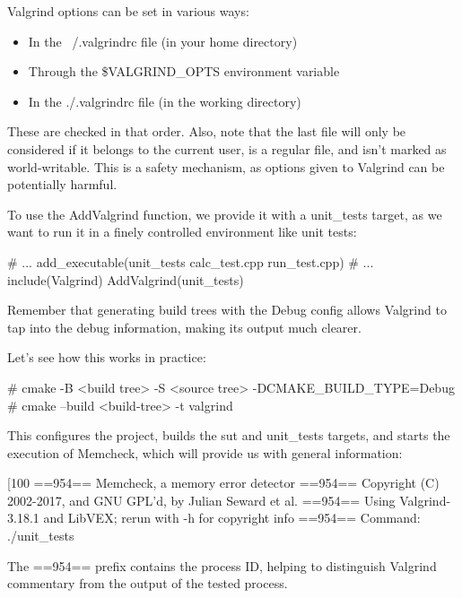 Valgrind options can be set in various ways:

\begin{itemize}
\item
In the ~/.valgrindrc file (in your home directory)

\item
Through the \$VALGRIND\_OPTS environment variable

\item
In the ./.valgrindrc file (in the working directory)
\end{itemize}

These are checked in that order. Also, note that the last file will only be considered if it belongs to the current user, is a regular file, and isn’t marked as world-writable. This is a safety mechanism, as options given to Valgrind can be potentially harmful.

To use the AddValgrind function, we provide it with a unit\_tests target, as we want to run it in a finely controlled environment like unit tests:


\begin{cmake}
# ...
add_executable(unit_tests calc_test.cpp run_test.cpp)
# ...
include(Valgrind)
AddValgrind(unit_tests)
\end{cmake}

Remember that generating build trees with the Debug config allows Valgrind to tap into the debug information, making its output much clearer.

Let’s see how this works in practice:

\begin{shell}
# cmake -B <build tree> -S <source tree> -DCMAKE_BUILD_TYPE=Debug
# cmake --build <build-tree> -t valgrind
\end{shell}

This configures the project, builds the sut and unit\_tests targets, and starts the execution of Memcheck, which will provide us with general information:

\begin{shell}
[100%
==954== Memcheck, a memory error detector
==954== Copyright (C) 2002-2017, and GNU GPL'd, by Julian Seward et al.
==954== Using Valgrind-3.18.1 and LibVEX; rerun with -h for copyright info
==954== Command: ./unit_tests
\end{shell}

The ==954== prefix contains the process ID, helping to distinguish Valgrind commentary from the output of the tested process.

